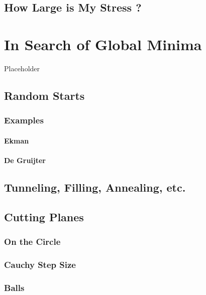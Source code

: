 \documentclass[
  12pt,
]{book}
\begin{document}
\section{How Large is My Stress ?}\label{how-large-is-my-stress}

\chapter{In Search of Global Minima}\label{global}

Placeholder

\section{Random Starts}\label{random-starts}

\subsection{Examples}\label{examples-3}

\subsubsection{Ekman}\label{ekman}

\subsubsection{De Gruijter}\label{de-gruijter}

\section{Tunneling, Filling, Annealing, etc.}\label{tunneling-filling-annealing-etc.}

\section{Cutting Planes}\label{globcutplanes}

\subsection{On the Circle}\label{globalcircle}

\subsection{Cauchy Step Size}\label{cauchy-step-size-1}

\subsection{Balls}\label{balls}
\end{document}
